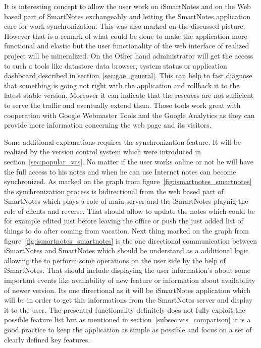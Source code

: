It is interesting concept to allow the user work on iSmartNotes and on the Web based part of SmartNotes exchangeably  and letting the SmartNotes application care for work synchronization. This was also marked on the discussed picture. However that is a remark of what could be done to make the application more functional and elastic but the user functionality of the web interface of realized project will be mineralized. On the Other hand administrator will get the access to such a tools like datastore data browser, system status or application dashboard described in section~\ref{sec:gae_general}. This can help to fast diagnose that something is going not right with the application and rollback it to the latest stable version. Moreover  it can indicate that the rescuers are not sufficient to serve the traffic and eventually extend them. Those tools work great with cooperation with Google Webmaster Tools and the Google Analytics as they can provide more information concerning the web page and its visitors.

Some additional explanations requires the synchronization feature. It will be realized by the version control system which were introduced in section~\ref{sec:popular_vcs}. No matter if the user works online or not he will have the full access to his notes and when he can use Internet notes can become synchronized. As marked on the graph from figure~\ref{fig:ismartnotes_smartnotes} the synchronization process is bidirectional from the web based part of SmartNotes which plays a role of main server and the iSmartNotes playnig the role of clients and reverse. That should allow to update the notes which could be for example edited just before leaving the office or push the just added list of things to do after coming from vacation. Next thing marked on the graph from figure~\ref{fig:ismartnotes_smartnotes} is the one directional communication between iSmartNotes and SmartNotes which should be understand as a additional logic allowing the to perform some operations on the user side by the help of iSmartNotes. That should include displaying the user information's about some important events like availability of new feature or information about availability of newer version.  Its one directional as it will be iSmartNotes application which will be in order to get this informations from the SmartNotes server and display it to the user. The presented functionality definitely does not fully exploit the possible feature list but as mentioned in section~\ref{subsec:vcs_comparison} it is a good practice to keep the application as simple as possible and focus on a set of clearly defined key features.

